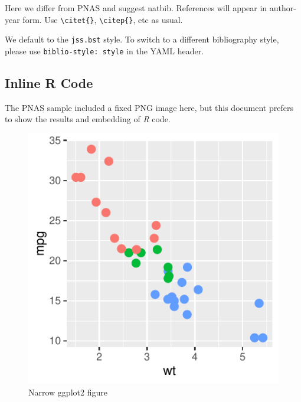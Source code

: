 \documentclass[letterpaper,9pt,twocolumn,twoside,]{pinp}
\begin{document}
Here we differ from PNAS and suggest natbib. References will appear in
author-year form. Use \texttt{\textbackslash{}citet\{\}},
\texttt{\textbackslash{}citep\{\}}, etc as usual.

We default to the \texttt{jss.bst} style. To switch to a different
bibliography style, please use \texttt{biblio-style:\ style} in the YAML
header.

\hypertarget{inline-r-code}{%
\subsection{Inline R Code}\label{inline-r-code}}

The PNAS sample included a fixed PNG image here, but this document
prefers to show the results and embedding of \emph{R} code.

\begin{Shaded}
\begin{Highlighting}[]
\OperatorTok{+}
\StringTok{    }\NormalTok{(}\NormalTok{, }\NormalTok{(}\OperatorTok{+}
\StringTok{    }\NormalTok{(}\NormalTok{)}
\end{Highlighting}
\end{Shaded}

\begin{figure}

{\centering \includegraphics{report_issaclee_files/figure-latex/figex-1} 

}

\caption{Narrow ggplot2 figure}\label{fig:figex}
\end{figure}
\end{document}
